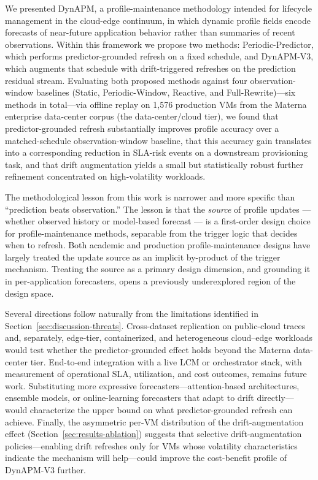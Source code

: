 \documentclass[manuscript,screen,review,anonymous]{acmart}
\begin{document}
We presented DynAPM, a profile-maintenance methodology intended for
lifecycle management in the cloud-edge continuum, in which dynamic
profile fields encode forecasts of near-future application behavior
rather than summaries of recent observations. Within this framework
we propose two methods: Periodic-Predictor, which performs
predictor-grounded refresh on a fixed schedule, and DynAPM-V3, which
augments that schedule with drift-triggered refreshes on the
prediction residual stream. Evaluating both proposed methods against
four observation-window baselines (Static, Periodic-Window, Reactive,
and Full-Rewrite)---six methods in total---via offline replay on
1{,}576 production VMs from the Materna enterprise data-center
corpus (the data-center/cloud tier), we found that predictor-grounded
refresh substantially improves profile accuracy over a
matched-schedule observation-window baseline, that this accuracy gain
translates into a corresponding reduction in SLA-risk events on a
downstream provisioning task, and that drift augmentation yields a
small but statistically robust further refinement concentrated on
high-volatility workloads.

The methodological lesson from this work is narrower and more
specific than ``prediction beats observation.'' The lesson is
that the \emph{source} of profile updates --- whether observed
history or model-based forecast --- is a first-order design
choice for profile-maintenance methods, separable from the
trigger logic that decides when to refresh. Both academic and
production profile-maintenance designs have largely treated the
update source as an implicit by-product of the trigger
mechanism. Treating the source as a primary design dimension,
and grounding it in per-application forecasters, opens a
previously underexplored region of the design space.

Several directions follow naturally from the limitations
identified in Section~\ref{sec:discussion-threats}.
Cross-dataset replication on public-cloud traces and, separately,
edge-tier, containerized, and heterogeneous cloud--edge workloads
would test whether the predictor-grounded effect holds beyond the
Materna data-center tier. End-to-end integration with a live LCM
or orchestrator stack, with measurement of operational SLA,
utilization, and cost outcomes, remains future work. Substituting
more expressive forecasters---attention-based architectures,
ensemble models, or online-learning forecasters that adapt to
drift directly---would characterize the upper bound on what
predictor-grounded refresh can achieve. Finally, the asymmetric
per-VM distribution of the drift-augmentation effect
(Section~\ref{sec:results-ablation}) suggests that selective
drift-augmentation policies---enabling drift refreshes only for
VMs whose volatility characteristics indicate the mechanism will
help---could improve the cost-benefit profile of DynAPM-V3 further.
\end{document}
